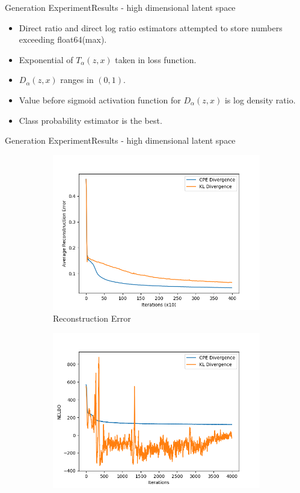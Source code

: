 \documentclass{beamer}
\begin{document}
\begin{frame}{Generation Experiment}{Results - high dimensional latent space}
\begin{itemize}
\item Direct ratio and direct log ratio estimators attempted to store numbers exceeding float64(max).
\item Exponential of $T_\alpha(z,x)$ taken in loss function.
\item $D_\alpha(z,x)$ ranges in $(0,1)$.
\item Value before sigmoid activation function for $D_\alpha(z,x)$ is log density ratio.
\item Class probability estimator is the best.
\end{itemize}
\end{frame}
\begin{frame}{Generation Experiment}{Results - high dimensional latent space}
\begin{figure}
\begin{subfigure}{0.49\textwidth}
\includegraphics[width=\linewidth]{part4reconerrors/PCADVvsPCKLD.png}
\caption{Reconstruction Error}
\end{subfigure}
\begin{subfigure}{0.49\textwidth}
\includegraphics[width=\linewidth]{part4nelbos/PCADVvsPCKLD.png}

\end{subfigure}
\end{figure}
\end{frame}
\end{document}
